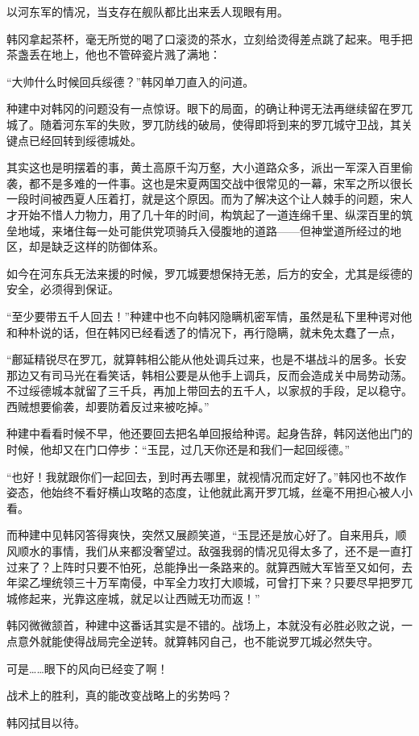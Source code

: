 以河东军的情况，当支存在舰队都比出来丢人现眼有用。

韩冈拿起茶杯，毫无所觉的喝了口滚烫的茶水，立刻给烫得差点跳了起来。甩手把茶盏丢在地上，他也不管碎瓷片溅了满地：

“大帅什么时候回兵绥德？”韩冈单刀直入的问道。

种建中对韩冈的问题没有一点惊讶。眼下的局面，的确让种谔无法再继续留在罗兀城了。随着河东军的失败，罗兀防线的破局，使得即将到来的罗兀城守卫战，其关键点已经回转到绥德城处。

其实这也是明摆着的事，黄土高原千沟万壑，大小道路众多，派出一军深入百里偷袭，都不是多难的一件事。这也是宋夏两国交战中很常见的一幕，宋军之所以很长一段时间被西夏人压着打，就是这个原因。而为了解决这个让人棘手的问题，宋人才开始不惜人力物力，用了几十年的时间，构筑起了一道连绵千里、纵深百里的筑垒地域，来堵住每一处可能供党项骑兵入侵腹地的道路——但神堂道所经过的地区，却是缺乏这样的防御体系。

如今在河东兵无法来援的时候，罗兀城要想保持无恙，后方的安全，尤其是绥德的安全，必须得到保证。

“至少要带五千人回去！”种建中也不向韩冈隐瞒机密军情，虽然是私下里种谔对他和种朴说的话，但在韩冈已经看透了的情况下，再行隐瞒，就未免太蠢了一点，

“鄜延精锐尽在罗兀，就算韩相公能从他处调兵过来，也是不堪战斗的居多。长安那边又有司马光在看笑话，韩相公要是从他手上调兵，反而会造成关中局势动荡。不过绥德城本就留了三千兵，再加上带回去的五千人，以家叔的手段，足以稳守。西贼想要偷袭，却要防着反过来被吃掉。”

种建中看看时候不早，他还要回去把名单回报给种谔。起身告辞，韩冈送他出门的时候，他却又在门口停步：“玉昆，过几天你还是和我们一起回绥德。”

“也好！我就跟你们一起回去，到时再去哪里，就视情况而定好了。”韩冈也不故作姿态，他始终不看好横山攻略的态度，让他就此离开罗兀城，丝毫不用担心被人小看。

而种建中见韩冈答得爽快，突然又展颜笑道，“玉昆还是放心好了。自来用兵，顺风顺水的事情，我们从来都没奢望过。敌强我弱的情况见得太多了，还不是一直打过来了？上阵时只要不怕死，总能挣出一条路来的。就算西贼大军皆至又如何，去年梁乙埋统领三十万军南侵，中军全力攻打大顺城，可曾打下来？只要尽早把罗兀城修起来，光靠这座城，就足以让西贼无功而返！”

韩冈微微颔首，种建中这番话其实是不错的。战场上，本就没有必胜必败之说，一点意外就能使得战局完全逆转。就算韩冈自己，也不能说罗兀城必然失守。

可是……眼下的风向已经变了啊！

战术上的胜利，真的能改变战略上的劣势吗？

韩冈拭目以待。

